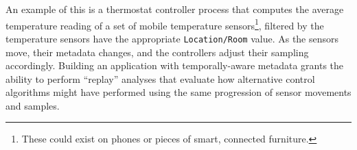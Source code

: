 An example of this is a thermostat controller process that computes the
average temperature reading of a set of mobile temperature sensors\footnote{These
could exist on phones or pieces of smart, connected furniture.}, filtered by
the temperature sensors have the appropriate \texttt{Location/Room} value. As
the sensors move, their metadata changes, and the controllers adjust their
sampling accordingly. Building an application with temporally-aware metadata
grants the ability to perform ``replay'' analyses that evaluate how
alternative control algorithms might have performed using the same progression
of sensor movements and samples.

